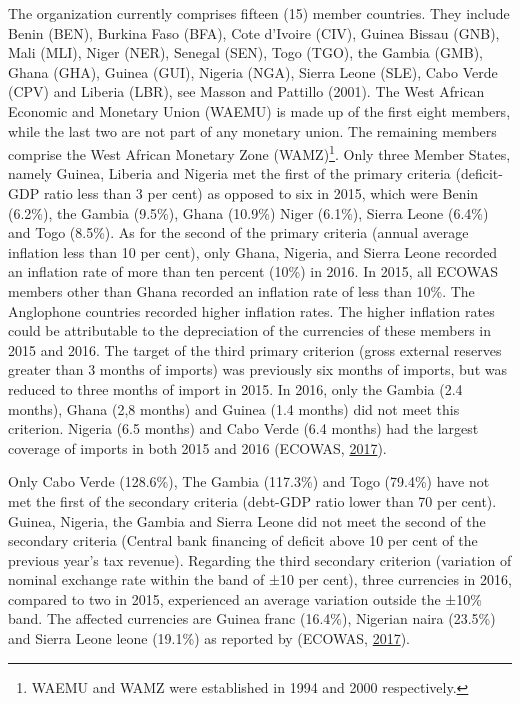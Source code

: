 \documentclass[]{article}
\let\rmarkdownfootnote\footnote%
\def\footnote{\protect\rmarkdownfootnote}
\begin{document}
The organization currently comprises fifteen (15) member countries. They include Benin (BEN), Burkina Faso (BFA), Cote d'Ivoire (CIV), Guinea Bissau (GNB), Mali (MLI), Niger (NER), Senegal (SEN), Togo (TGO), the Gambia (GMB), Ghana (GHA), Guinea (GUI), Nigeria (NGA), Sierra Leone (SLE), Cabo Verde (CPV) and Liberia (LBR), see Masson and Pattillo (2001). The West African Economic and Monetary Union (WAEMU) is made up of the first eight members, while the last two are not part of any monetary union. The remaining members comprise the West African Monetary Zone (WAMZ)\footnote{WAEMU and WAMZ were established in 1994 and 2000 respectively.}. Only three Member States, namely Guinea, Liberia and Nigeria met the first of the primary criteria (deficit-GDP ratio less than 3 per cent) as opposed to six in 2015, which were Benin (6.2\%), the Gambia (9.5\%), Ghana (10.9\%) Niger (6.1\%), Sierra Leone (6.4\%) and Togo (8.5\%). As for the second of the primary criteria (annual average inflation less than 10 per cent), only Ghana, Nigeria, and Sierra Leone recorded an inflation rate of more than ten percent (10\%) in 2016. In 2015, all ECOWAS members other than Ghana recorded an inflation rate of less than 10\%. The Anglophone countries recorded higher inflation rates. The higher inflation rates could be attributable to the depreciation of the currencies of these members in 2015 and 2016. The target of the third primary criterion (gross external reserves greater than 3 months of imports) was previously six months of imports, but was reduced to three months of import in 2015. In 2016, only the Gambia (2.4 months), Ghana (2,8 months) and Guinea (1.4 months) did not meet this criterion. Nigeria (6.5 months) and Cabo Verde (6.4 months) had the largest coverage of imports in both 2015 and 2016 (ECOWAS, \protect\hyperlink{ref-ECOWAS2017}{2017}).

Only Cabo Verde (128.6\%), The Gambia (117.3\%) and Togo (79.4\%) have not met the first of the secondary criteria (debt-GDP ratio lower than 70 per cent). Guinea, Nigeria, the Gambia and Sierra Leone did not meet the second of the secondary criteria (Central bank financing of deficit above 10 per cent of the previous year's tax revenue). Regarding the third secondary criterion (variation of nominal exchange rate within the band of ±10 per cent), three currencies in 2016, compared to two in 2015, experienced an average variation outside the ±10\% band. The affected currencies are Guinea franc (16.4\%), Nigerian naira (23.5\%) and Sierra Leone leone (19.1\%) as reported by (ECOWAS, \protect\hyperlink{ref-ECOWAS2017}{2017}).
\end{document}
